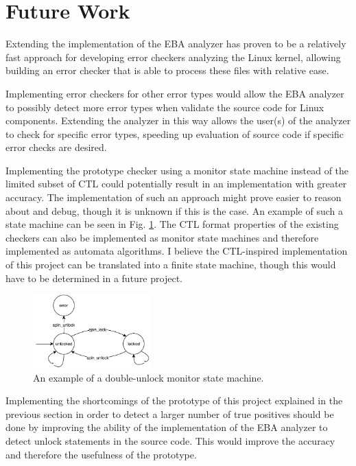 \section{Future Work}

\newpar Extending the implementation of the EBA analyzer has proven to be a relatively fast approach for developing error checkers analyzing the Linux kernel, allowing building an error checker that is able to process these files with relative ease. 

\newpar Implementing error checkers for other error types would allow the EBA analyzer to possibly detect more error types when validate the source code for Linux components. Extending the analyzer in this way allows the user(s) of the analyzer to check for specific error types, speeding up evaluation of source code if specific error checks are desired. 

\newpar Implementing the prototype checker using a monitor state machine instead of the limited subset of CTL could potentially result in an implementation with greater accuracy. The implementation of such an approach might prove easier to reason about and debug, though it is unknown if this is the case. An example of such a state machine can be seen in Fig. \ref{fig:statemachine}. The CTL format properties of the existing checkers can also be implemented as monitor state machines and therefore implemented as automata algorithms. I believe the CTL-inspired implementation of this project can be translated into a finite state machine, though this would have to be determined in a future project. 

\begin{figure}[h]
    \centering
    \includegraphics[width=0.4\textwidth]{futurework/figures/state-machine}
    \caption{An example of a double-unlock monitor state machine.}
    \label{fig:statemachine}
\end{figure}

\newpar Implementing the shortcomings of the prototype of this project explained in the previous section in order to detect a larger number of true positives should be done by improving the ability of the implementation of the EBA analyzer to detect unlock statements in the source code. This would improve the accuracy and therefore the usefulness of the prototype.

